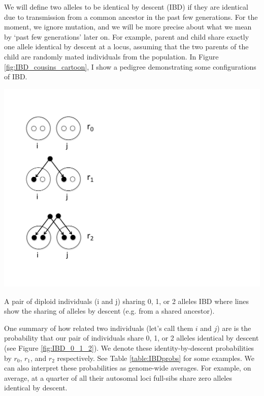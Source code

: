 We will define two alleles to be identical by descent (IBD) if they are
identical due to transmission from a common ancestor in the past few generations\cite{cotterman:40,malecot:48}. For the moment,
we ignore mutation, and we will be more precise about what we mean by `past few
generations' later on. For example, parent and child share exactly one allele
identical by descent at a locus, assuming that the two parents of the child are
randomly mated individuals from the population. In Figure
\ref{fig:IBD_cousins_cartoon}, I show a pedigree demonstrating some
configurations of IBD. \\
\begin{marginfigure}[0cm]
\begin{center}
\includegraphics[width= 0.75 \textwidth]{figures/sharing_relatives/IBD_0_1_2.pdf}
\end{center}
\caption{A pair of diploid individuals (i and j) sharing 0, 1, or 2 alleles IBD
  where lines show the sharing of alleles by descent (e.g. from a
  shared ancestor). } \label{fig:IBD_0_1_2}
\end{marginfigure}
One summary of how related two individuals (let's call them $i$ and $j$) are is the probability that our pair
of individuals share 0, 1, or 2 alleles identical by descent (see Figure
\ref{fig:IBD_0_1_2}). We denote these  identity-by-descent probabilities by $r_0$, $r_1$, and $r_2$
respectively. See Table \ref{table:IBDprobs} for some examples. We can also
interpret these probabilities as genome-wide averages. For example, on average, at a quarter of all their autosomal loci
full-sibs share zero alleles identical by descent.\\



